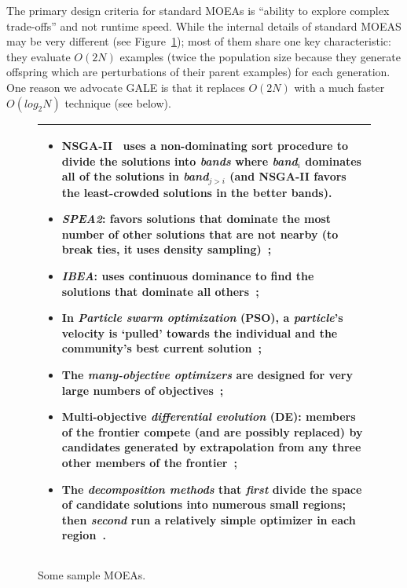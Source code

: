 \documentclass[journal]{IEEEtran}
\newcommand{\bi}{\begin{itemize}}
\newcommand{\ei}{\end{itemize}}
\newcommand{\fig}[1]{Figure~\ref{fig:#1}}
\begin{document}
The primary design criteria for standard MOEAs is ``ability to explore complex trade-offs'' and not runtime speed.
While the internal details of standard MOEAS may be very different (see \fig{sample}); most of them share one key characteristic:
they evaluate $O(2N)$ examples (twice the population size because they generate offspring which are perturbations of their parent examples) for each generation.  One reason we advocate GALE is that it replaces
 $O(2N)$ with a much faster $O(log_2N)$ technique (see below).


\begin{figure}
\begin{tabular}{|p{.95\linewidth}|}\hline
\small
\bi
\item NSGA-II~\cite{deb00afast} 
uses a non-dominating sort procedure to divide the solutions into {\em bands} where {\em band}$_i$ dominates all of the solutions in {\em band}$_{j>i}$ (and NSGA-II favors the
least-crowded solutions in the better bands).
\item
{\em SPEA2}: favors solutions that dominate the most number of other solutions that are not nearby (to break ties, it uses density sampling)~\cite{zit02}; 
\item {\em  IBEA}:
uses continuous dominance to find the solutions that dominate all others~\cite{Zitzler04indicator-basedselection}; 
\item In {\em Particle swarm optimization} (PSO), a {\em particle}'s velocity is `pulled' towards the individual and the community's best current solution~\cite{pan08};
\item 
The {\em many-objective optimizers} are designed for very large numbers of objectives~\cite{deb14}; 
\item
Multi-objective {\em differential evolution} (DE): members of the frontier compete (and are possibly replaced) by candidates generated by extrapolation from any three other members of the frontier~\cite{storn97,5601760};
\item
The {\em decomposition methods} that {\em first} divide the space of candidate solutions into numerous small regions; then {\em second} run a relatively simple optimizer in
each region~\cite{deb05,zhang07}.
\ei \\\hline
\end{tabular}
\caption{Some sample MOEAs.}\label{fig:sample}
\end{figure}
\end{document}
